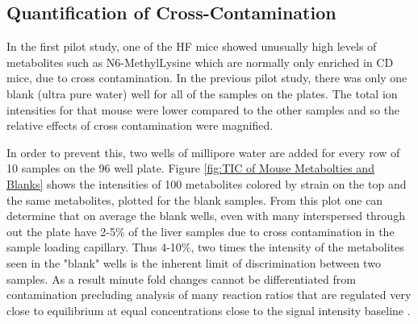 \documentclass[a4paper,11pt,twoside]{book}
\begin{document}
	\subsection*{Quantification of Cross-Contamination }
	
	In the first pilot study, one of the HF mice showed unusually high levels of metabolites such as N6-MethylLysine which are normally only enriched in CD mice, due to cross contamination. In the previous pilot study, there was only one blank (ultra pure water) well for all of the samples on the plates. The total ion intensities for that mouse were lower compared to the other samples and so the relative effects of cross contamination were magnified. 
	
	In order to prevent this, two wells of millipore water are added for every row of 10 samples on the 96 well plate. Figure \ref{fig:TIC of Mouse Metabolties and Blanks} shows the intensities of 100 metabolites colored by strain on the top and the same metabolites, plotted for the blank samples. From this plot one can determine that on average the blank wells, even with many interspersed through out the plate have 2-5\% of the liver samples due to cross contamination in the sample loading capillary. Thus 4-10\%, two times the intensity of the metabolites seen in the "blank" wells is the inherent limit of discrimination between two samples. As a result minute fold changes cannot be differentiated from contamination precluding analysis of many reaction ratios that are regulated very close to equilibrium at equal concentrations close to the signal intensity baseline \citep{VanEunen2010,Traut1994,Beard2002,Schellenberger2010}.
	
\end{document}
